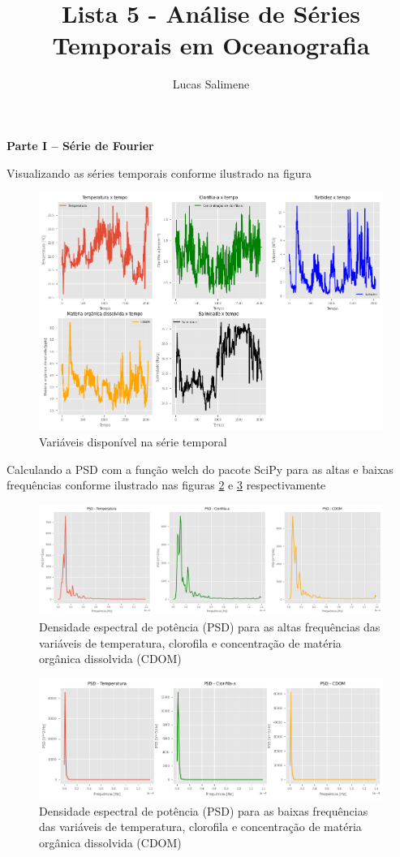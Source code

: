 \documentclass[12pt,a4paper,portuguese]{article}
\title{Lista 5 - Análise de Séries Temporais em Oceanografia}
\author{Lucas Salimene}
\date{}
\begin{document}
	\maketitle
	\newpage
	\textbf{Parte I – Série de Fourier}
	
	Visualizando as séries temporais conforme ilustrado na figura
	
\begin{figure}[H]
	\centering
	\includegraphics[width=1\linewidth]{lista5-1b}
	\caption{Variáveis disponível na série temporal}
	\label{fig:lista5-1b}
\end{figure}

Calculando a PSD com a função welch do pacote SciPy para as altas e baixas frequências conforme ilustrado nas figuras \ref{fig:lista5-2c} e \ref{fig:lista5-2d} respectivamente
	\begin{figure}[H]
		\centering
		\includegraphics[width=1\linewidth]{lista5-2c}
		\caption{Densidade espectral de potência (PSD) para as altas frequências das variáveis de temperatura, clorofila e concentração de matéria orgânica dissolvida (CDOM) }
		\label{fig:lista5-2c}
	\end{figure}
		\begin{figure}[H]
		\centering
		\includegraphics[width=1\linewidth]{lista5-2d}
		\caption{Densidade espectral de potência (PSD) para as baixas frequências das variáveis de temperatura, clorofila e concentração de matéria orgânica dissolvida (CDOM) }
		\label{fig:lista5-2d}
	\end{figure}
\end{document}
